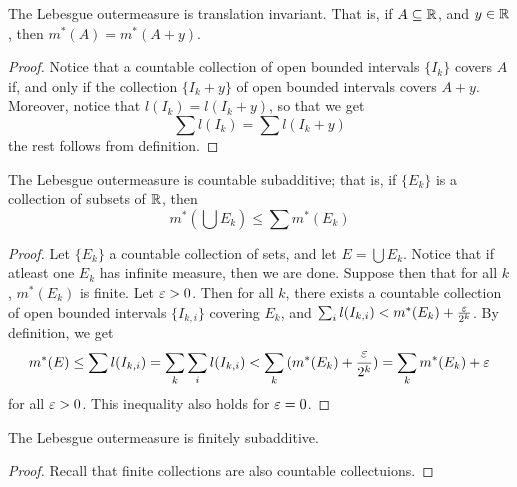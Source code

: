 \begin{lemma}\label{2.1.3}
    The Lebesgue outermeasure is translation invariant. That is, if $A \subseteq
    \mathbb{R}$, and  $y \in \mathbb{R}$, then  $m^\ast(A)=m^\ast(A+y)$.
\end{lemma}
\begin{proof}
    Notice that a countable collection of open bounded intervals $\{I_k\}$
    covers $A$ if, and only if the collection  $\{I_k+y\}$ of open bounded
    intervals covers $A+y$. Moreover, notice that  $l(I_k)=l(I_k+y)$, so that we
    get
    \begin{equation*}
        \sum{l(I_k)}=\sum{l(I_k+y)}
    \end{equation*}
    the rest follows from definition.
\end{proof}

\begin{lemma}\label{2.1.4}
    The Lebesgue outermeasure is countable subadditive; that is, if $\{E_k\}$ is
    a collection of subsets of $\mathbb{R}$, then
    \begin{equation*}
        m^\ast(\bigcup{E_k}) \leq \sum{m^\ast(E_k)}
    \end{equation*}
\end{lemma}
\begin{proof}
    Let $\{E_k\}$ a countable collection of sets, and let $E=\bigcup{E_k}$.
    Notice that if atleast one $E_k$ has infinite measure, then we are done.
    Suppose then that for all $k$, $m^\ast(E_k)$ is finite. Let $\varepsilon>0$. Then for
    all  $k$, there exists a countable collection of open bounded intervals
    $\{I_{k,i}\}$ covering $E_k$, and
    $\sum_i{l(I_{k,i})}<m^\ast(E_k)+\frac{\varepsilon}{2^k}$. By definition, we get
    \begin{equation*}
        m^\ast(E) \leq \sum{l(I_{k,i})}=\sum_k{\sum_i{l(I_{k,i})}}
        <\sum_k{(m^\ast(E_k)+\frac{\varepsilon}{2^k})}=\sum_k{m^\ast(E_k)}+\varepsilon
    \end{equation*}
    for all $\varepsilon>0$. This inequality also holds for  $\varepsilon=0$.
\end{proof}
\begin{corollary}
    The Lebesgue outermeasure is finitely subadditive.
\end{corollary}
\begin{proof}
    Recall that finite collections are also countable collectuions.
\end{proof}
